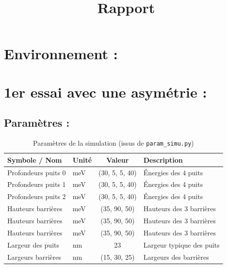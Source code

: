 \documentclass{article}
\title{Rapport}
\begin{document}
\maketitle

\section*{Environnement :}

\section*{1er essai avec une asymétrie :}


\subsection{Paramètres :}
\begin{table}[H]
  \centering
  \caption{Paramètres de la simulation (issus de \texttt{param\_simu.py})}
  \label{tab:params}
  \begin{tabularx}{0.95\linewidth}{
      >{\raggedright\arraybackslash}p{4cm}
      >{\raggedright\arraybackslash}p{2.5cm}
      S[table-format=3.3]
      >{\raggedright\arraybackslash}X
  }
    \toprule
    \textbf{Symbole / Nom} & \textbf{Unité} & \textbf{Valeur} & \textbf{Description} \\
    \midrule
    Profondeurs puits 0       & \si{\milli\electronvolt} & (30, 5, 5, 40) & Énergies des 4 puits \\
    Profondeurs puits 1       & \si{\milli\electronvolt} & (30, 5, 5, 40) & Énergies des 4 puits \\
    Profondeurs puits  2      & \si{\milli\electronvolt} & (30, 5, 5, 40) & Énergies des 4 puits \\
    Hauteurs barrières       & \si{\milli\electronvolt} & (35, 90, 50) & Hauteurs des 3 barrières \\
    Hauteurs barrières       & \si{\milli\electronvolt} & (35, 90, 50) & Hauteurs des 3 barrières \\
    Hauteurs barrières       & \si{\milli\electronvolt} & (35, 90, 50) & Hauteurs des 3 barrières \\
    Largeur des puits        & \si{\nano\metre} & 23 & Largeur typique des puits \\
    Largeurs barrières       & \si{\nano\metre} & (15, 30, 25) & Largeurs des barrières \\
    \bottomrule
  \end{tabularx}
\end{table}
\end{document}
